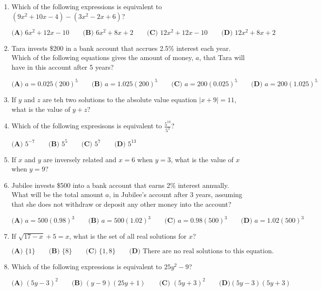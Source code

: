 \documentclass[../satmath.tex]{subfiles}
\begin{document}
\begin{enumerate}[label=\bfseries\arabic*.]
\item Which of the following expressions is equivalent to $(9x^2+10x-4)-(3x^2-2x+6)$?

$\textbf{(A) } 6x^2+12x-10 \qquad \textbf{(B) } 6x^2+8x+2 \qquad \textbf{(C) } 12x^2+12x-10 \qquad \textbf{(D) } 12x^2+8x+2$

\item Tara invests \$200 in a bank account that accrues 2.5\% interest each year. Which of the following equations gives the amount of money, $a$, that
Tara will have in this account after 5 years?

$\textbf{(A) } a=0.025(200)^5 \qquad \textbf{(B) } a=1.025(200)^5 \qquad \textbf{(C) } a=200(0.025)^5 \qquad \textbf{(D) } a=200(1.025)^5$
 
\item If $y$ and $z$ are teh two solutions to the absolute value equation $|x+9|=11$, what is the value of $y+z$?
 
\item Which of the following expresisons is equivalent to $\frac{5^{10}}{5^3}$?

$\textbf{(A) } 5^{-7} \qquad \textbf{(B) } 5^5 \qquad \textbf{(C) } 5^7 \qquad \textbf{(D) } 5^{13}$

\item If $x$ and $y$ are inversely related and $x=6$ when $y=3$, what is the value of $x$ when $y=9$?

\item Jubilee invests \$500 into a bank account that earns 2\% interest annually. What will be the total amount $a$, in Jubilee's account after 3 years, 
assuming that she does not withdraw or deposit any other money into the account?

$\textbf{(A) } a=500(0.98)^3 \qquad \textbf{(B) } a=500(1.02)^3 \qquad \textbf{(C) } a=0.98(500)^3 \qquad \textbf{(D) } a=1.02(500)^3$

\item If $\sqrt{17-x}+5=x$, what is the set of all real solutions for $x$?

$\textbf{(A) } \{1\} \qquad \textbf{(B) } \{8\} \qquad \textbf{(C) } \{1, 8\} \qquad \textbf{(D) } \text{There are no real solutions to this equation.}$
 
\item Which of the following expressions is equivalent to $25y^2-9$?

$\textbf{(A) } (5y-3)^2 \qquad \textbf{(B) } (y-9)(25y+1) \qquad \textbf{(C) } (5y+3)^2 \qquad \textbf{(D)} (5y-3)(5y+3)$


\end{enumerate}
\end{document}
